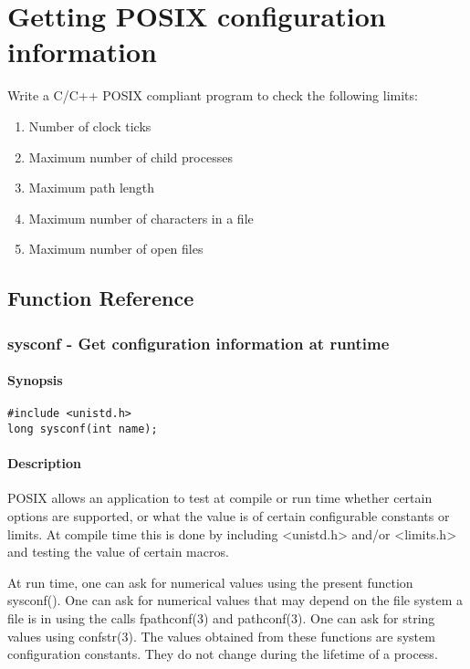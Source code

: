 \chapter{Getting POSIX configuration information}

Write a C/C++ POSIX compliant program to check the following limits:
\begin{enumerate}
	\item Number of clock ticks
	\item Maximum number of child processes
	\item Maximum path length
	\item Maximum number of characters in a file
	\item Maximum number of open files
\end{enumerate}

\jobname

\section{Function Reference}

\subsection{sysconf - Get configuration information at runtime}

\subsubsection{Synopsis}

\begin{lstlisting}
#include <unistd.h>
long sysconf(int name);
\end{lstlisting}

\subsubsection{Description}

POSIX allows an application to test at compile or run time whether certain options are supported, or what the value is of certain configurable constants or limits. At compile time this is done by including <unistd.h> and/or <limits.h> and testing the value of certain macros.

At run time, one can ask for numerical values using the present function sysconf(). One can ask for numerical values that may depend on the file system a file is in using the calls fpathconf(3) and pathconf(3). One can ask for string values using confstr(3). The values obtained from these functions are system configuration constants. They do not change during the lifetime of a process.

